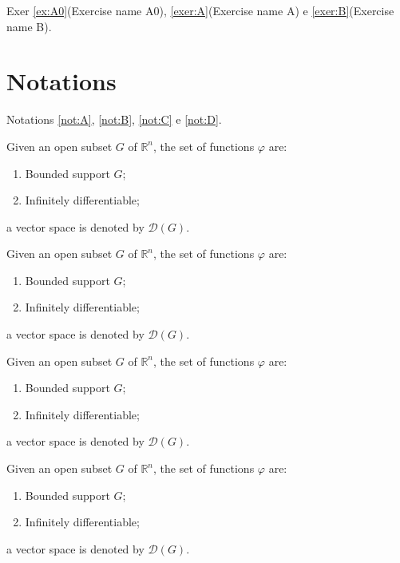 Exer \ref{ex:A0}(Exercise name A0), \ref{exer:A}(Exercise name A) e \ref{exer:B}(Exercise name B).

\section{Notations}

Notations \ref{not:A}, \ref{not:B}, \ref{not:C} e \ref{not:D}.

\begin{notation}
\label{not:A}
Given an open subset $G$ of $\mathbb{R}^n$, the set of functions $\varphi$ are:
\begin{enumerate}
\item Bounded support $G$;
\item Infinitely differentiable;
\end{enumerate}
a vector space is denoted by $\mathcal{D}(G)$. 
\end{notation}

\begin{notation}
\label{not:B}
Given an open subset $G$ of $\mathbb{R}^n$, the set of functions $\varphi$ are:
\begin{enumerate}
\item Bounded support $G$;
\item Infinitely differentiable;
\end{enumerate}
a vector space is denoted by $\mathcal{D}(G)$. 
\end{notation}

\begin{notation}
\label{not:C}
Given an open subset $G$ of $\mathbb{R}^n$, the set of functions $\varphi$ are:
\begin{enumerate}
\item Bounded support $G$;
\item Infinitely differentiable;
\end{enumerate}
a vector space is denoted by $\mathcal{D}(G)$. 
\end{notation}

\begin{notation}
\label{not:D}
Given an open subset $G$ of $\mathbb{R}^n$, the set of functions $\varphi$ are:
\begin{enumerate}
\item Bounded support $G$;
\item Infinitely differentiable;
\end{enumerate}
a vector space is denoted by $\mathcal{D}(G)$. 
\end{notation}

